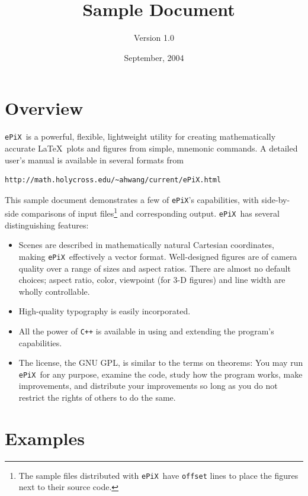 \documentclass[11pt]{article}
\title{\ePiX\ Sample Document}
\author{Version 1.0}
\date{September, 2004}
\newcommand{\ePiX}{\texttt{ePiX}}
\begin{document}
\maketitle

\section{Overview}

\ePiX\ is a powerful, flexible, lightweight utility for creating
mathematically accurate \LaTeX\ plots and figures from simple,
mnemonic commands. A detailed user's manual is available in several
formats from
\begin{verbatim}
http://math.holycross.edu/~ahwang/current/ePiX.html
\end{verbatim}
This sample document demonstrates a few of \ePiX's capabilities, with
side-by-side comparisons of input files\footnote{The sample files
distributed with \ePiX\ have \texttt{offset} lines to place the figures
next to their source code.} and corresponding output. \ePiX\ has several 
distinguishing features:
\begin{itemize}

\item Scenes are described in mathematically natural Cartesian
coordinates, making \ePiX\ effectively a vector format. Well-designed
figures are of camera quality over a range of sizes and aspect ratios.
There are almost no default choices; aspect ratio, color, viewpoint
(for 3-D figures) and line width are wholly controllable.

\item High-quality typography is easily incorporated.

\item All the power of \texttt{C++} is available in using and extending 
the program's capabilities.

\item The license, the GNU GPL, is similar to the terms on theorems:
You may run \ePiX\ for any purpose, examine the code, study how the
program works, make improvements, and distribute your improvements so
long as you do not restrict the rights of others to do the same.

\end{itemize}

\section{Examples}
\end{document}
